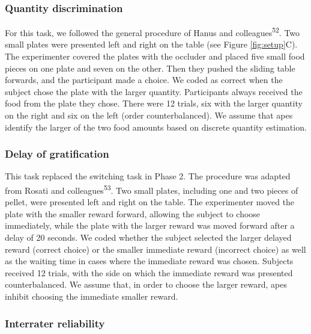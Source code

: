 \documentclass[
  man,floatsintext]{apa6}
\begin{document}
\hypertarget{quantity-discrimination}{%
\subsubsection{Quantity discrimination}\label{quantity-discrimination}}

For this task, we followed the general procedure of Hanus and colleagues\textsuperscript{52}. Two small plates were presented left and right on the table (see Figure \ref{fig:setup}C). The experimenter covered the plates with the occluder and placed five small food pieces on one plate and seven on the other. Then they pushed the sliding table forwards, and the participant made a choice. We coded as correct when the subject chose the plate with the larger quantity. Participants always received the food from the plate they chose. There were 12 trials, six with the larger quantity on the right and six on the left (order counterbalanced). We assume that apes identify the larger of the two food amounts based on discrete quantity estimation.

\hypertarget{delay-of-gratification}{%
\subsubsection{Delay of gratification}\label{delay-of-gratification}}

This task replaced the switching task in Phase 2. The procedure was adapted from Rosati and colleagues\textsuperscript{53}. Two small plates, including one and two pieces of pellet, were presented left and right on the table. The experimenter moved the plate with the smaller reward forward, allowing the subject to choose immediately, while the plate with the larger reward was moved forward after a delay of 20 seconds. We coded whether the subject selected the larger delayed reward (correct choice) or the smaller immediate reward (incorrect choice) as well as the waiting time in cases where the immediate reward was chosen. Subjects received 12 trials, with the side on which the immediate reward was presented counterbalanced. We assume that, in order to choose the larger reward, apes inhibit choosing the immediate smaller reward.

\hypertarget{interrater-reliability}{%
\subsubsection{Interrater reliability}\label{interrater-reliability}}
\end{document}
